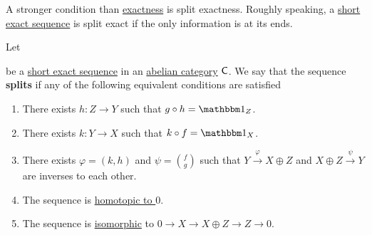 \documentclass[../../main]{subfiles}
\begin{document}
A stronger condition than \hyperref[def:exact-sequence]{exactness} is split exactness.
Roughly speaking, a \hyperref[def:exact-sequence]{short exact sequence} is split exact if the only information is at its ends.
\begin{proposition}\label{prop:split-exact-sequence}
  Let
  \begin{center}
  \end{center}
  be a \hyperref[def:exact-sequence]{short exact sequence} in an \hyperref[def:abelian-category]{abelian category} \(\mathsf{C}\).
  We say that the sequence \textbf{splits} if any of the following equivalent conditions are satisfied
  \begin{enumerate}
    \item There exists \(h\colon Z \to Y\) such that \(g \circ h = \id_{Z}\).
    \item There exists \(k\colon Y \to X\) such that \(k \circ f = \id_{X}\).
    \item There exists \(\varphi = (k, h)\) and \(\psi = {f \choose g}\) such that \(Y \xrightarrow{\varphi} X \oplus Z\) and \(X \oplus Z \xrightarrow{\psi} Y\) are inverses to each other.
    \item The sequence is \hyperref[def:homotopy]{homotopic to \(0\)}.
    \item The sequence is \hyperref[def:categorical-isomorphism]{isomorphic} to \(0 \to X \to X \oplus Z \to Z \to 0\).
  \end{enumerate}
\end{proposition}
\end{document}
